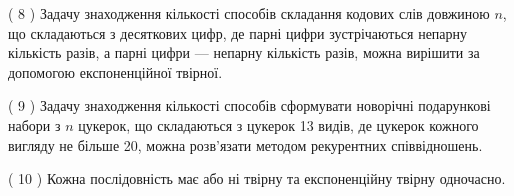 \documentclass[12pt, ukrainian]{article}
\begin{document}
\begin {large}
{( 8 ) Задачу знаходження кількості способів складання кодових слів довжиною $n$, що складаються з десяткових цифр, де парні цифри зустрічаються непарну кількість разів, а парні цифри — непарну кількість разів, можна вирішити за допомогою експоненційної твірної.%

( 9 ) Задачу знаходження кількості способів сформувати новорічні подарункові набори з $n$ цукерок, що складаються з цукерок 13 видів, де цукерок кожного вигляду не більше 20, можна розв’язати методом рекурентних співвідношень.%

( 10 ) Кожна послідовність має або ні твірну та експоненційну твірну одночасно.%
}
\end {large}

\vspace{4mm}
\newpage
\end{document}
